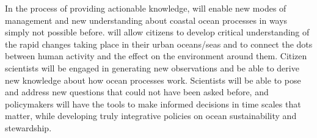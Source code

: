 




In the process of providing actionable knowledge, \pro will enable new
modes of management and new understanding about coastal ocean
processes in ways simply not possible before. \pro will allow citizens
to develop critical understanding of the rapid changes taking place in
their urban oceans/seas and to connect the dots between human activity
and the effect on the environment around them. Citizen scientists will
be engaged in generating new observations and be able to derive new
knowledge about how ocean processes work. Scientists will be able to
pose and address new questions that could not have been asked before,
and policymakers will have the tools to make informed decisions in
time scales that matter, while developing truly integrative policies
on ocean sustainability and stewardship.


